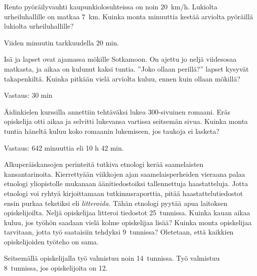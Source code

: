 \begin{tehtavasivu}
\begin{tehtava}
Rento pyöräilyvauhti kaupunkiolosuhteissa on noin $20$~km/h. Lukiolta urheiluhallille on matkaa $7$~km. Kuinka monta minuuttia kestää arviolta pyöräillä lukiolta urheiluhallille?
\begin{vastaus}
Viiden minuutin tarkkuudella $20$ min.
\end{vastaus}
\end{tehtava}

\begin{tehtava}
    Isä ja lapset ovat ajamassa mökille Sotkamoon. On ajettu jo neljä
    viidesosaa matkasta, ja aikaa on kulunut kaksi tuntia. ''Joko ollaan perillä?''
    lapset kysyvät takapenkiltä. Kuinka pitkään vielä arviolta kuluu, ennen
    kuin ollaan mökillä?
    
    \begin{vastaus}
        Vastaus: 30 min
    \end{vastaus}
\end{tehtava}

\begin{tehtava}
    Äidinkielen kurssilla annettiin tehtäväksi lukea 300-sivuinen romaani.
    Eräs opiskelija otti aikaa ja selvitti lukevansa vartissa seitsemän sivua.
    Kuinka monta tuntia häneltä kuluu koko romaanin lukemiseen, jos
    taukoja ei lasketa?
    
    \begin{vastaus}
        Vastaus: 642 minuuttia eli 10 h 42 min.
    \end{vastaus}
\end{tehtava}

\begin{tehtava}
Alkuperäiskansojen perinteitä tutkiva etnologi kerää saamelaisten kansantarinoita. Kierrettyään viikkojen ajan saamelaisperheiden vieraana palaa etnologi yliopistolle mukanaan äänitiedostoiksi tallennettuja haastatteluja. Jotta etnologi voi ryhtyä kirjoittamaan tutkimusraporttia, pitää haastattelutiedostot ensin purkaa tekstiksi eli \emph{litteroida.} Tähän etnologi pyytää apua laitoksen opiskelijoilta. Neljä opiskelijaa litteroi tiedostot 25~tunnissa. Kuinka kauan aikaa kuluu, jos työhön saadaan vielä kolme opiskelijaa lisää? Kuinka monta opiskelijaa tarvitaan, jotta työ saataisiin tehdyksi 9~tunnissa? Oletetaan, että kaikkien opiskelijoiden työteho on sama.

\begin{vastaus}
Seitsemällä opiskelijalla työ valmistuu noin 14~tunnissa. Työ valmistuu 8~tunnissa, jos opiskelijoita on  12.
\end{vastaus}
\end{tehtava}


\end{tehtavasivu}

